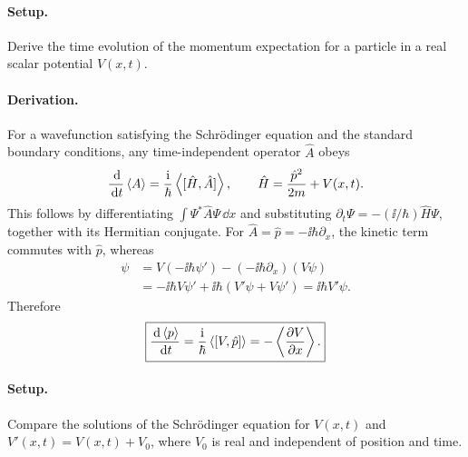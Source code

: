 \paragraph{Setup.} Derive the time evolution of the momentum expectation for a particle in a real scalar potential $V(x,t)$.
\paragraph{Derivation.}
For a wavefunction satisfying the Schrödinger equation and the standard boundary conditions, any time-independent operator $\hat A$ obeys
\begin{equation}
\frac{\,\mathrm{d}}{\,\mathrm{d} t}\left\langle A\right\rangle
=\frac{\mathrm{i}}{\hbar}\left\langle [\hat H,\hat A]\right\rangle,
\qquad \hat H=\frac{\hat p^2}{2m}+V(x,t).
\end{equation}
This follows by differentiating $\int\Psi^*\hat A\Psi\,\dd x$ and substituting
$\partial_t\Psi=-(\ii/\hbar)\hat H\Psi$, together with its Hermitian conjugate. For $\hat A=\hat p=-\ii\hbar\partial_x$, the kinetic term commutes with $\hat p$, whereas
\begin{align}
[V,\hat p]\psi
&=V(-\ii\hbar\psi')-(-\ii\hbar\partial_x)(V\psi)\\
&=-\ii\hbar V\psi'+\ii\hbar(V'\psi+V\psi')
=\ii\hbar V'\psi.
\end{align}
Therefore
\begin{equation}
\boxed{\frac{\,\mathrm{d}\left\langle p\right\rangle}{\,\mathrm{d} t}
=\frac{\mathrm{i}}{\hbar}\left\langle [V,\hat p]\right\rangle
=-\left\langle \frac{\partial V}{\partial x}\right\rangle.}
\end{equation}

\paragraph{Setup.} Compare the solutions of the Schrödinger equation for $V(x,t)$ and $V'(x,t)=V(x,t)+V_0$, where $V_0$ is real and independent of position and time.
